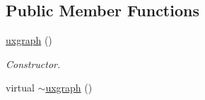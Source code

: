 \subsection*{Public Member Functions}
\begin{DoxyCompactItemize}
\item 
\hyperlink{classlgraph_1_1utils_1_1uxgraph_a20d8499ed3e0297b43b6dfc0c0042c44}{uxgraph} ()\hypertarget{classlgraph_1_1utils_1_1uxgraph_a20d8499ed3e0297b43b6dfc0c0042c44}{}\label{classlgraph_1_1utils_1_1uxgraph_a20d8499ed3e0297b43b6dfc0c0042c44}

\begin{DoxyCompactList}\small\item\em Constructor. \end{DoxyCompactList}\item 
virtual \hyperlink{classlgraph_1_1utils_1_1uxgraph_a1909df52804b8b883f43ccbf9c3226cf}{$\sim$uxgraph} ()\hypertarget{classlgraph_1_1utils_1_1uxgraph_a1909df52804b8b883f43ccbf9c3226cf}{}\label{classlgraph_1_1utils_1_1uxgraph_a1909df52804b8b883f43ccbf9c3226cf}


\end{DoxyCompactItemize}
